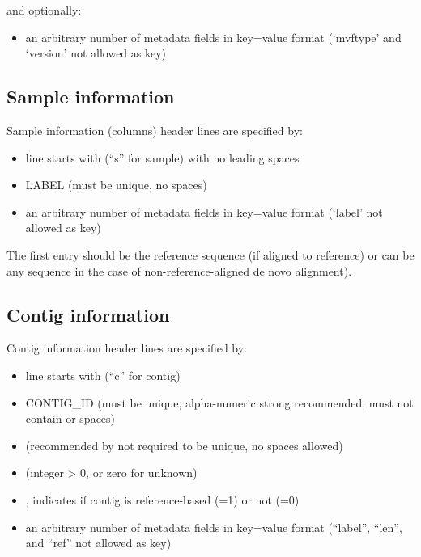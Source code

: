 \documentclass[letterpaper,11pt,english]{sphinxmanual}
\begin{document}
and optionally:
\begin{itemize}
\item {} 
an arbitrary number of metadata fields in key=value format (‘mvftype’ and ‘version’ not allowed as key)

\end{itemize}


\subsection{Sample information}
\label{\detokenize{mvf_spec:sample-information}}
Sample information (columns) header lines are specified by:
\begin{itemize}
\item {} 
line starts with  (“s” for sample) with no leading spaces

\item {} 
LABEL (must be unique, no spaces)

\item {} 
an arbitrary number of metadata fields in key=value format (‘label’ not allowed as key)

\end{itemize}

The first entry should be the reference sequence (if aligned to reference) or can be any sequence in the case of non-reference-aligned de novo alignment).


\subsection{Contig information}
\label{\detokenize{mvf_spec:contig-information}}
Contig information header lines are specified by:
\begin{itemize}
\item {} 
line starts with  (“c” for contig)

\item {} 
CONTIG\_ID (must be unique, alpha-numeric strong recommended, must not contain  or spaces)

\item {} 
 (recommended by not required to be unique, no spaces allowed)

\item {} 
 (integer \textgreater{} 0, or zero for unknown)

\item {} 
, indicates if contig is reference-based (=1) or not (=0)

\item {} 
an arbitrary number of metadata fields in key=value format (“label”, “len”, and “ref” not allowed as key)

\end{itemize}
\end{document}
